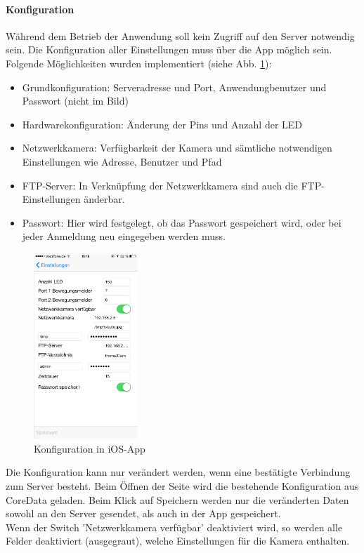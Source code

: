 \paragraph{Konfiguration} Während dem Betrieb der Anwendung soll kein Zugriff auf den Server notwendig sein. Die Konfiguration aller Einstellungen muss über die App möglich sein. Folgende Möglichkeiten wurden implementiert (siehe Abb. \ref{fig:image-config}): 
\begin{itemize}
	\item Grundkonfiguration: Serveradresse und Port, Anwendungbenutzer und Passwort (nicht im Bild)
	\item Hardwarekonfiguration: Änderung der Pins und Anzahl der LED
	\item Netzwerkkamera: Verfügbarkeit der Kamera und sämtliche notwendigen Einstellungen wie Adresse, Benutzer und Pfad
	\item FTP-Server: In Verknüpfung der Netzwerkkamera sind auch die FTP-Einstellungen änderbar. 
	\item Passwort: Hier wird festgelegt, ob das Passwort gespeichert wird, oder bei jeder Anmeldung neu eingegeben werden muss.
\end{itemize}
\begin{figure}
	\vspace{-100pt}
	\begin{center}
		\includegraphics[width=0.35\textwidth]{./data/config.png}
	\end{center}
	\vspace{-20pt}
	\caption{\label{fig:image-config}Konfiguration in iOS-App}
	\vspace{-10pt}
\end{figure}

Die Konfiguration kann nur verändert werden, wenn eine bestätigte Verbindung zum Server besteht. Beim Öffnen der Seite wird die bestehende Konfiguration aus CoreData geladen. Beim Klick auf Speichern werden nur die veränderten Daten sowohl an den Server gesendet, als auch in der App gespeichert.\\
Wenn der Switch 'Netzwerkkamera verfügbar' deaktiviert wird, so werden alle Felder deaktiviert (ausgegraut), welche Einstellungen für die Kamera enthalten.

